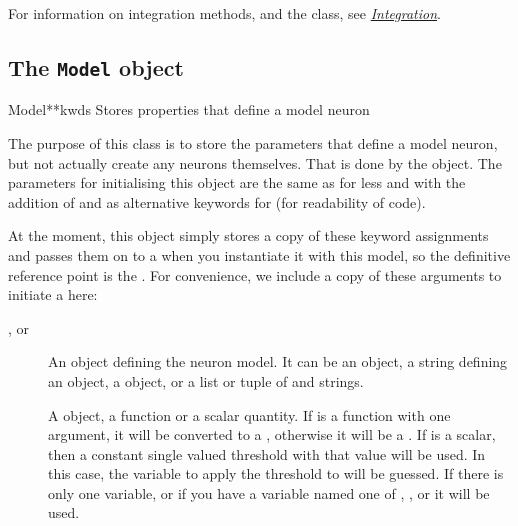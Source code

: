 \documentclass[letterpaper,10pt]{manual}
\begin{document}
For information on integration methods, and the 
class, see \hyperlink{integration}{\emph{Integration}}.

\subsection{The \texttt{Model} object}


\hypertarget{brian.Model}{}\begin{classdesc}{Model}{**kwds}
Stores properties that define a model neuron

The purpose of this class is to store the parameters that define
a model neuron, but not actually create any neurons themselves. That is
done by the \hyperlink{brian.NeuronGroup}{} object. The parameters for initialising
this object are the same as for \hyperlink{brian.NeuronGroup}{} less  and
with the addition of  and  as
alternative keywords for  (for readability of code).

At the moment, this object simply stores a copy of these keyword
assignments and passes them on to a \hyperlink{brian.NeuronGroup}{} when you
instantiate it with this model, so the definitive reference point is
the \hyperlink{brian.NeuronGroup}{}. For convenience, we include a copy of these
arguments to initiate a \hyperlink{brian.Model}{} here:
\begin{description}
\item[,  or ]
An object defining the neuron model. It can be
an \hyperlink{brian.Equations}{} object, a string defining an \hyperlink{brian.Equations}{} object,
a  object, or a list or tuple of \hyperlink{brian.Equations}{} and
strings.

\item[]
A \hyperlink{brian.Threshold}{} object, a function or a scalar quantity.
If  is a function with one argument, it will be
converted to a \hyperlink{brian.SimpleFunThreshold}{}, otherwise it will be a
\hyperlink{brian.FunThreshold}{}. If  is a scalar, then a constant
single valued threshold with that value will be used. In this case,
the variable to apply the threshold to will be guessed. If there is
only one variable, or if you have a variable named one of
, ,  or  it will be used.


\end{description}
\end{classdesc}
\end{document}
